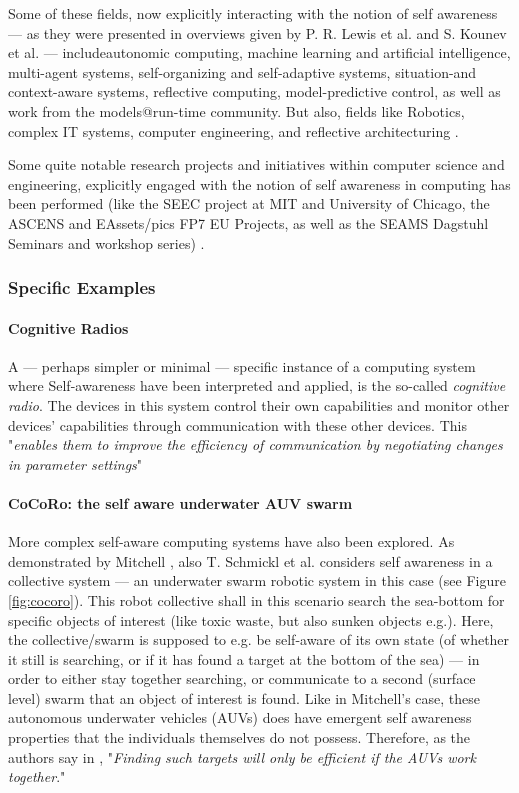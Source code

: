 	Some of these fields, now explicitly interacting with the notion of self awareness — as they were presented in overviews given by P. R. Lewis et al. \cite{sacs17_ch3} and S. Kounev et al. \cite{sacs17_ch1} — includeautonomic computing, machine learning and artificial intelligence, multi-agent systems, self-organizing and self-adaptive systems, situation-and context-aware systems, reflective computing, model-predictive control, as well as work from the models@run-time community. But also, fields like Robotics, complex IT systems, computer engineering, and reflective architecturing \cite{sacs17_ch3}.

	Some quite notable research projects and initiatives within computer science and engineering, explicitly engaged with the notion of self awareness in computing has been performed (like the SEEC project at MIT and University of Chicago, the ASCENS and EAssets/pics FP7 EU Projects, as well as the SEAMS Dagstuhl Seminars and workshop series) \cite{sacs17_ch1}.


		\subsubsection{Specific Examples}

			\paragraph{Cognitive Radios \nl}

			A — perhaps simpler or minimal — specific instance of a computing system where Self-awareness have been interpreted and applied, is the so-called \textit{cognitive radio}. The devices in this system control their own capabilities and monitor other devices' capabilities through communication with these other devices. This "\textit{enables them to improve the efficiency of communication by negotiating changes in parameter settings}" \cite{sacs17_ch3}

			\paragraph{CoCoRo: the self aware underwater AUV swarm \nl}

			More complex self-aware computing systems have also been explored. As demonstrated by Mitchell \cite{mitchell_decentralizedSA}, also T. Schmickl et al. considers self awareness in a collective system — an underwater swarm robotic system \cite{cocoro} in this case (see Figure \ref{fig:cocoro}). This robot collective shall in this scenario search the sea-bottom for specific objects of interest (like toxic waste, but also sunken objects e.g.). Here, the collective/swarm is supposed to e.g. be self-aware of its own state (of whether it still is searching, or if it has found a target at the bottom of the sea) — in order to either stay together searching, or communicate to a second (surface level) swarm that an object of interest is found. Like in Mitchell's case, these autonomous underwater vehicles (AUVs) does have emergent self awareness properties that the individuals themselves do not possess. Therefore, as the authors say in \cite{cocoro}, "\textit{Finding such targets will only be efficient if the AUVs work together}."

